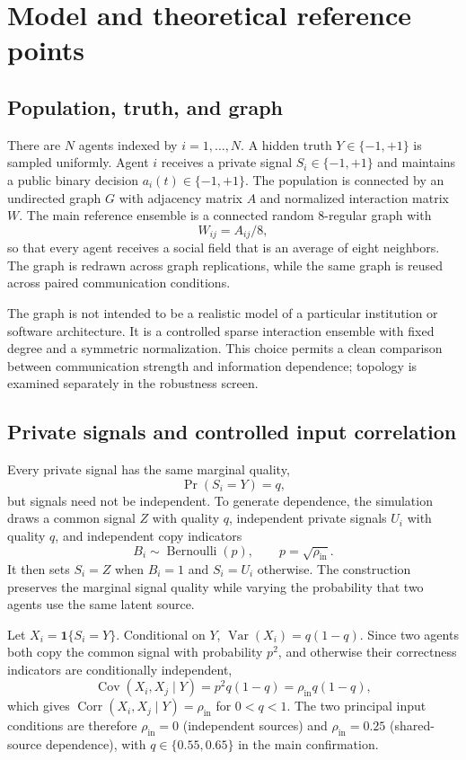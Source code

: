 \documentclass[11pt,a4paper]{article}
\begin{document}
\section{Model and theoretical reference points}

\subsection{Population, truth, and graph}

There are $N$ agents indexed by $i=1,\ldots,N$. A hidden truth $Y\in\{-1,+1\}$ is sampled uniformly. Agent $i$ receives a private signal $S_i\in\{-1,+1\}$ and maintains a public binary decision $a_i(t)\in\{-1,+1\}$. The population is connected by an undirected graph $G$ with adjacency matrix $A$ and normalized interaction matrix $W$. The main reference ensemble is a connected random 8-regular graph with
\[
W_{ij}=A_{ij}/8,
\]
so that every agent receives a social field that is an average of eight neighbors. The graph is redrawn across graph replications, while the same graph is reused across paired communication conditions.

The graph is not intended to be a realistic model of a particular institution or software architecture. It is a controlled sparse interaction ensemble with fixed degree and a symmetric normalization. This choice permits a clean comparison between communication strength and information dependence; topology is examined separately in the robustness screen.

\subsection{Private signals and controlled input correlation}

Every private signal has the same marginal quality,
\[
\Pr(S_i=Y)=q,
\]
but signals need not be independent. To generate dependence, the simulation draws a common signal $Z$ with quality $q$, independent private signals $U_i$ with quality $q$, and independent copy indicators
\[
B_i\sim\operatorname{Bernoulli}(p),\qquad p=\sqrt{\rho_{\mathrm{in}}}.
\]
It then sets $S_i=Z$ when $B_i=1$ and $S_i=U_i$ otherwise. The construction preserves the marginal signal quality while varying the probability that two agents use the same latent source.

Let $X_i=\mathbf{1}\{S_i=Y\}$. Conditional on $Y$, $\operatorname{Var}(X_i)=q(1-q)$. Since two agents both copy the common signal with probability $p^2$, and otherwise their correctness indicators are conditionally independent,
\begin{equation}
\operatorname{Cov}(X_i,X_j\mid Y)=p^2q(1-q)=\rho_{\mathrm{in}}q(1-q),
\end{equation}
which gives $\operatorname{Corr}(X_i,X_j\mid Y)=\rho_{\mathrm{in}}$ for $0<q<1$. The two principal input conditions are therefore $\rho_{\mathrm{in}}=0$ (independent sources) and $\rho_{\mathrm{in}}=0.25$ (shared-source dependence), with $q\in\{0.55,0.65\}$ in the main confirmation.
\end{document}
